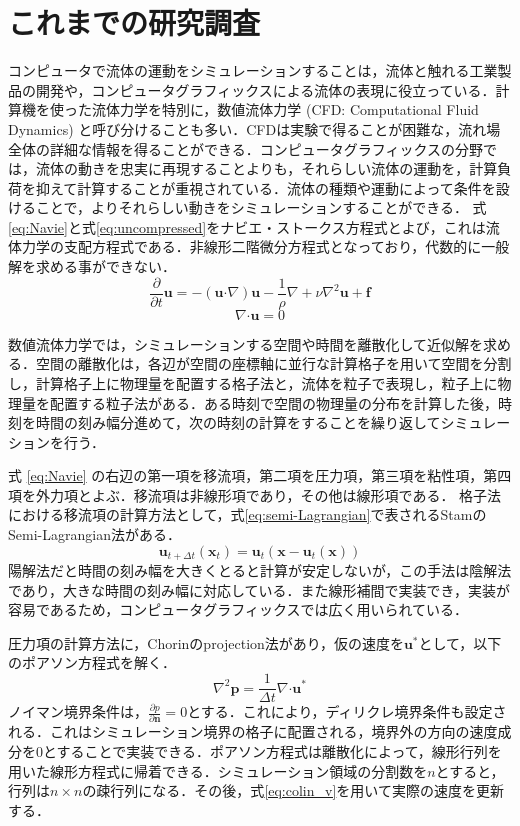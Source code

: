 \documentclass[10pt,a4paper,notitlepage,oneside,twocolumn]{abst_jsarticle}
\begin{document}
\section{これまでの研究調査} \label{sec:intro}
コンピュータで流体の運動をシミュレーションすることは，流体と触れる工業製品の開発や，コンピュータグラフィックスによる流体の表現に役立っている．計算機を使った流体力学を特別に，数値流体力学 (CFD: Computational Fluid Dynamics) と呼び分けることも多い．CFDは実験で得ることが困難な，流れ場全体の詳細な情報を得ることができる．コンピュータグラフィックスの分野では，流体の動きを忠実に再現することよりも，それらしい流体の運動を，計算負荷を抑えて計算することが重視されている．流体の種類や運動によって条件を設けることで，よりそれらしい動きをシミュレーションすることができる．
式 \ref{eq:Navie}と式\ref{eq:uncompressed}をナビエ・ストークス方程式とよび，これは流体力学の支配方程式である．非線形二階微分方程式となっており，代数的に一般解を求める事ができない．
\begin{equation}\label{eq:Navie}
\frac{\partial}{\partial t}\bm{u} = - (\bm{u} \boldsymbol{\cdot}\nabla) \bm{u} - \frac{1}{\rho}\nabla + \nu\nabla^2\bm{u} + \bm{f}
\end{equation}
\begin{equation}\label{eq:uncompressed}
\nabla\boldsymbol{\cdot}\bm{u} = 0
\end{equation}

数値流体力学では，シミュレーションする空間や時間を離散化して近似解を求める．空間の離散化は，各辺が空間の座標軸に並行な計算格子を用いて空間を分割し，計算格子上に物理量を配置する格子法と，流体を粒子で表現し，粒子上に物理量を配置する粒子法がある．ある時刻で空間の物理量の分布を計算した後，時刻を時間の刻み幅分進めて，次の時刻の計算をすることを繰り返してシミュレーションを行う．

式 \ref{eq:Navie} の右辺の第一項を移流項，第二項を圧力項，第三項を粘性項，第四項を外力項とよぶ．移流項は非線形項であり，その他は線形項である．
格子法における移流項の計算方法として，式\ref{eq:semi-Lagrangian}で表されるStamのSemi-Lagrangian法\cite{semi-Lagrangian}がある．
\begin{equation}\label{eq:semi-Lagrangian}
\bm{u}_{t+\Delta t}(\bm{x}_t) = \bm{u}_t(\bm{x}-\bm{u}_t(\bm{x}))
\end{equation}
陽解法だと時間の刻み幅を大きくとると計算が安定しないが，この手法は陰解法であり，大きな時間の刻み幅に対応している．また線形補間で実装でき，実装が容易であるため，コンピュータグラフィックスでは広く用いられている．

圧力項の計算方法に，Chorinのprojection法\cite{projection}があり，仮の速度を$\bm{u}^*$として，以下のポアソン方程式を解く．
\begin{equation}\label{eq:colin_p}
\nabla^2 \bm{p} =  \frac{1}{\Delta t}\nabla\boldsymbol{\cdot}\bm{u}^*
\end{equation} 
ノイマン境界条件は，$\frac{\partial p}{\partial \bm{n}} = 0$とする．これにより，ディリクレ境界条件も設定される．これはシミュレーション境界の格子に配置される，境界外の方向の速度成分を$0$とすることで実装できる．ポアソン方程式は離散化によって，線形行列を用いた線形方程式に帰着できる．シミュレーション領域の分割数を$n$とすると，行列は$n \times n$の疎行列になる．その後，式\ref{eq:colin_v}を用いて実際の速度を更新する．
\end{document}
